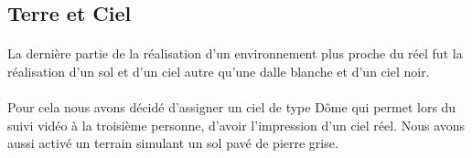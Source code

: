 \subsection{Terre et Ciel}

\paragraph{}
La dernière partie de la réalisation d'un environnement plus proche du réel fut
la réalisation d'un sol et d'un ciel autre qu'une dalle blanche et d'un ciel
noir.

\paragraph{}
Pour cela nous avons décidé d'assigner un ciel de type Dôme qui permet lors du
suivi vidéo à la troisième personne, d'avoir l'impression d'un ciel réel.
Nous avons aussi activé un terrain simulant un sol pavé de pierre grise.
